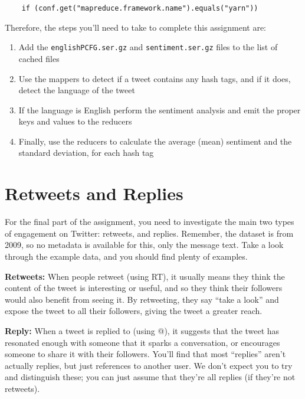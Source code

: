 \documentclass[a4paper,10pt]{article}
\begin{document}
  
  \begin{lstlisting}
    if (conf.get("mapreduce.framework.name").equals("yarn"))
  \end{lstlisting}
  
  Therefore, the steps you'll need to take to complete this assignment are: 
  
  \begin{enumerate}
    \item Add the \texttt{englishPCFG.ser.gz} and \texttt{sentiment.ser.gz} files to the list of cached files
    \item Use the mappers to detect if a tweet contains any hash tags, and if it does, detect the language of the tweet
    \item If the language is English perform the sentiment analysis and emit the proper keys and values to the reducers
    \item Finally, use the reducers to calculate the average (mean) sentiment and the standard deviation, for each hash tag
  \end{enumerate}
  
  
  
  \section{Retweets and Replies}
  
  
  For the final part of the assignment, you need to investigate the main two types of engagement on Twitter: retweets, and replies. Remember, the dataset is from 2009, so no metadata is available for this, only the message text. Take a look through the example data, and you should find plenty of examples. 
  
  \textbf{Retweets:} When people retweet (using RT), it usually means they think the content of the tweet is interesting or useful, and so they think their followers would also benefit from seeing it. By retweeting, they say ``take a look'' and expose the tweet to all their followers, giving the tweet a greater reach. 
  
  
  \textbf{Reply:} When a tweet is replied to (using @), it suggests that the tweet has resonated enough with someone that it sparks a conversation, or encourages someone to share it with their followers. You'll find that most ``replies'' aren't actually replies, but just references to another user. We don't expect you to try and distinguish these; you can just assume that they're all replies (if they're not retweets). 
  
\end{document}
